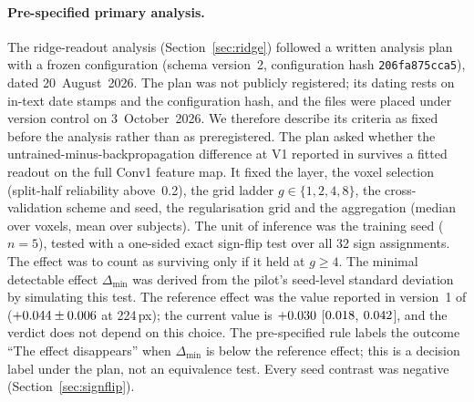 
\paragraph{Pre-specified primary analysis.}
The ridge-readout analysis (Section~\ref{sec:ridge}) followed a written analysis plan
with a frozen configuration (schema version~2, configuration hash \texttt{206fa875cca5}),
dated 20~August~2026. The plan was not publicly registered; its dating rests on in-text
date stamps and the configuration hash, and the files were placed under version control
on 3~October~2026. We therefore describe its criteria as fixed before the analysis rather
than as preregistered. The plan asked whether the untrained-minus-backpropagation
difference at V1 reported in \citet{evalres} survives a fitted readout on the full Conv1
feature map. It fixed the layer, the voxel selection (split-half reliability above~0.2),
the grid ladder $g \in \{1, 2, 4, 8\}$, the cross-validation scheme and seed, the
regularisation grid and the aggregation (median over voxels, mean over subjects). The
unit of inference was the training seed ($n = 5$), tested with a one-sided exact
sign-flip test over all 32 sign assignments. The effect was to count as surviving only
if it held at $g \geq 4$. The minimal detectable effect $\Delta_{\min}$ was derived from
the pilot's seed-level standard deviation by simulating this test. The reference effect
was the value reported in version~1 of \citet{evalres}
($+0.044 \pm 0.006$ at 224\,px); the current value is
$+0.030$ [$0.018$, $0.042$], and the verdict does not depend on this choice. The pre-specified rule labels the outcome ``The effect disappears'' when $\Delta_{\min}$ is below the reference effect; this is a decision label under the plan, not an equivalence test. Every seed contrast was negative (Section~\ref{sec:signflip}).

